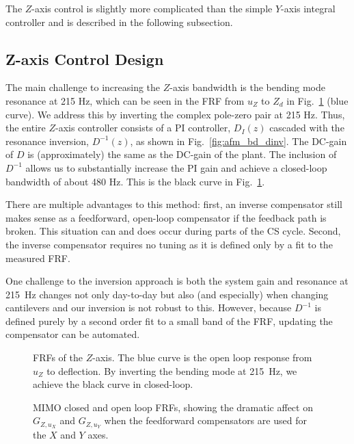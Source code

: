 \documentclass[twocolumn,oneside]{IEEEtran/IEEEtran}
\begin{document}
The $Z$-axis control is slightly more complicated than the simple $Y$-axis
integral controller and is described in the following subsection.
\subsection{Z-axis Control Design}\label{sec:zaxis_cs_control}
The main challenge to increasing the $Z$-axis bandwidth is the bending mode
resonance at 215 Hz, which can be seen in the FRF from $u_Z$ to $Z_{d}$ in
Fig.~\ref{fig:z_control} (blue curve). We address this by inverting the complex
pole-zero pair at 215 Hz. Thus, the entire $Z$-axis controller consists of a PI
controller, $D_I(z)$ cascaded with the resonance inversion, $D^{-1}(z)$, as shown in Fig.~\ref{fig:afm_bd_dinv}. The DC-gain
of $D$ is (approximately) the same as the DC-gain of the plant.
The inclusion of $D^{-1}$ allows us to substantially increase the PI gain and
achieve a closed-loop bandwidth of about 480 Hz. This is the black curve in Fig.~\ref{fig:z_control}.


There are multiple advantages to this method: first,
an inverse compensator still makes sense as a feedforward, open-loop compensator
if the feedback path is broken. This situation can and does occur during parts
of the CS cycle. Second, the inverse compensator
requires no tuning as it is defined only by a fit to the measured FRF.

One challenge to the inversion approach is both the system gain and resonance at 215~Hz
changes not only day-to-day but also (and especially) when changing cantilevers and our inversion is not robust to this. However, because $D^{-1}$ is defined purely by a second order fit to a small band of the FRF, updating the compensator can be automated.


\begin{figure}[t!]
  \centering
  
  \caption{FRFs of the $Z$-axis. The blue curve is the open loop response from $u_Z$ to deflection. By inverting the bending mode at 215~Hz, we achieve the black curve in closed-loop.}
  \label{fig:z_control}
\end{figure}


\begin{figure}
  \centering
  
  \caption{MIMO closed and open loop FRFs, showing the dramatic affect on $G_{Z,u_X}$ and $G_{Z,u_Y}$ when the feedforward compensators are used for the $X$ and $Y$ axes.}
  \label{fig:mimo_frf_uxuy}
\end{figure}
\end{document}
